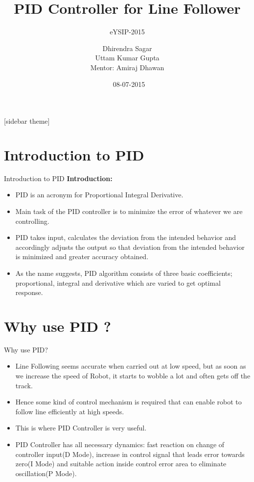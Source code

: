 \documentclass[10pt, a4paper]{beamer}
\begin{document}
	\title{PID Controller for Line Follower}
	\subtitle{eYSIP-2015 \\ }
	\author{Dhirendra Sagar\\ Uttam Kumar Gupta\\
		Mentor: Amiraj Dhawan}
	\date{\ 08-07-2015}
	\frame{\titlepage}
	
	[sidebar theme]
	\section{Introduction to PID}
	\begin{frame}{Introduction to PID}
		\textbf{Introduction:} \\
		\begin{itemize}
			\item PID is an acronym for Proportional Integral Derivative.
			\item Main task of the PID controller is to minimize the error of whatever we are controlling.
			\item PID takes input, calculates the deviation from the intended behavior and accordingly adjusts the output so that deviation from the intended behavior is minimized and greater accuracy obtained.
			\item As the name suggests, PID algorithm consists of three basic coefficients; proportional, integral and derivative which are varied to get optimal response. 
		\end{itemize}
	\end{frame}
	
	\section{Why use PID ?}
	\begin{frame}{Why use PID?}
		\begin{itemize}
			\item Line Following seems accurate when carried out at low speed, but as soon as we increase the speed of Robot, it starts to wobble a lot and often gets off the track.
			\item Hence some kind of control mechanism is required that can enable robot to follow line efficiently at high speeds.
			\item This is where PID Controller is very useful.
			\item PID Controller has all necessary dynamics: fast reaction on change of controller input(D Mode), increase in control signal that leads error towards zero(I Mode) and suitable action inside control error area to eliminate oscillation(P Mode). 
		\end{itemize}
	\end{frame}
	
\end{document}
